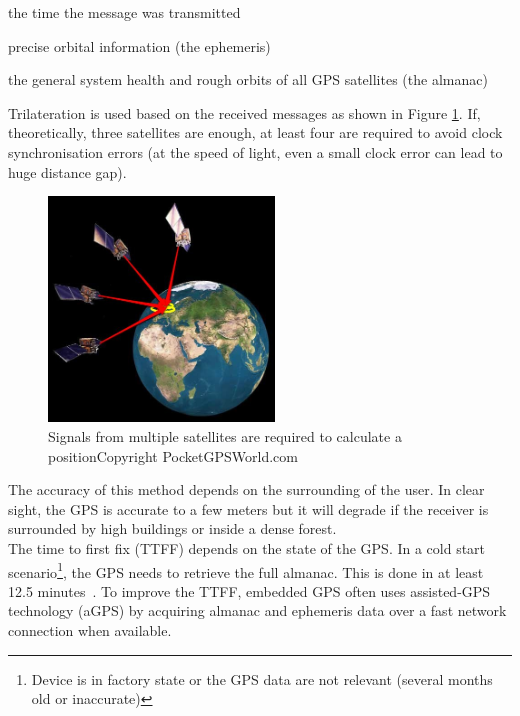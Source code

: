\begin{itemizealt}
\item the time the message was transmitted
\item precise orbital information (the ephemeris)
\item the general system health and rough orbits of all GPS satellites (the almanac)
\end{itemizealt}

Trilateration is used based on the received messages as shown in Figure \ref{fig:gps-earth}.
If, theoretically, three satellites are enough, at least four are required to avoid clock synchronisation errors (at the speed of light, even a small clock error can lead to huge distance gap).\\

\begin{figure}[h]
  \centering
  \includegraphics[width=6cm]{images/gps.jpg}
  \caption{Signals from multiple satellites are required to calculate a position\newline Copyright PocketGPSWorld.com}
  \label{fig:gps-earth}
\end{figure}


The accuracy of this method depends on the surrounding of the user.
In clear sight, the GPS is accurate to a few meters but it will degrade if the receiver is surrounded by high buildings or inside a dense forest.\\

The time to first fix (TTFF) depends on the state of the GPS.
In a cold start scenario\footnote{Device is in factory state or the GPS data are not relevant (several months old or inaccurate)}, the GPS needs to retrieve the full almanac.
This is done in at least 12.5 minutes~\cite{gpsuser}.
To improve the TTFF, embedded GPS often uses assisted-GPS technology (aGPS) by acquiring almanac and ephemeris data over a fast network connection when available.

